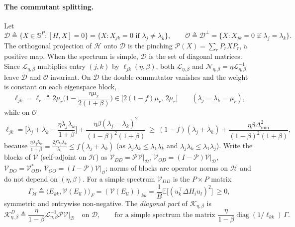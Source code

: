 \documentclass[11pt]{article}
\theoremstyle{remark}
\newcommand{\E}{\mathbb{E}}
\begin{document}
\paragraph{The commutant splitting.} Let
\[
\mathcal D\triangleq\{X\in\mathbb S^P:[H,X]=0\}=\{X:X_{jk}=0\text{ if }\lambda_j\ne\lambda_k\},\qquad\mathcal O\triangleq\mathcal D^{\perp}=\{X:X_{jk}=0\text{ if }\lambda_j=\lambda_k\}.
\]
The orthogonal projection of $\mathcal H$ onto $\mathcal D$ is the pinching $\mathcal P(X)=\sum_rP_rXP_r$, a positive map. When the spectrum is simple, $\mathcal D$ is the set of diagonal matrices. Since $\mathcal L_{\eta,\beta}$ multiplies entry $(j,k)$ by $\ell_{jk}(\eta,\beta)$, both $\mathcal L_{\eta,\beta}$ and $\mathcal N_{\eta,\beta}=\eta\mathcal L_{\eta,\beta}^{-1}$ leave $\mathcal D$ and $\mathcal O$ invariant. On $\mathcal D$ the double commutator vanishes and the weight is constant on each eigenspace block,
\begin{equation}\label{eq:diag-wD}
\ell_{jk}=\ell_r\triangleq2\mu_r\Big(1-\frac{\eta\mu_r}{2(1+\beta)}\Big)\in\big[2(1-f)\mu_r,\,2\mu_r\big]\qquad(\lambda_j=\lambda_k=\mu_r),
\end{equation}
while on $\mathcal O$
\begin{equation}\label{eq:diag-wO}
\ell_{jk}=\Big[\lambda_j+\lambda_k-\frac{\eta\lambda_j\lambda_k}{1+\beta}\Big]+\frac{\eta\beta(\lambda_j-\lambda_k)^2}{(1-\beta)^2(1+\beta)}\ \ge\ (1-f)(\lambda_j+\lambda_k)+\frac{\eta\beta\Delta_{\min}^2}{(1-\beta)^2(1+\beta)},
\end{equation}
because $\frac{\eta\lambda_j\lambda_k}{1+\beta}=\frac{2f\lambda_j\lambda_k}{\lambda_1}\le f(\lambda_j+\lambda_k)$ (as $\lambda_j\lambda_k\le\lambda_1\lambda_k$ and $\lambda_j\lambda_k\le\lambda_1\lambda_j$). Write the blocks of $\mathcal V$ (self-adjoint on $\mathcal H$) as $\mathcal V_{DD}=\mathcal P\mathcal V|_{\mathcal D}$, $\mathcal V_{OD}=(I-\mathcal P)\mathcal V|_{\mathcal D}$, $\mathcal V_{DO}=\mathcal V_{OD}^{*}$, $\mathcal V_{OO}=(I-\mathcal P)\mathcal V|_{\mathcal O}$; norms of blocks are operator norms on $\mathcal H$ and do not depend on $(\eta,\beta)$. For a simple spectrum $\mathcal V_{DD}$ is the $P\times P$ matrix
\begin{equation}\label{eq:diag-Gamma}
\Gamma_{kl}\triangleq\langle E_{kk},\mathcal V(E_{ll})\rangle_F=(\mathcal V(E_{ll}))_{kk}=\frac1B\E\big[(u_k^\top\Delta H_iu_l)^2\big]\ \ge0,
\end{equation}
symmetric and entrywise non-negative. The \emph{diagonal part} of $\mathcal K_{\eta,\beta}$ is
\[
\mathcal K^{D}_{\eta,\beta}\triangleq\frac{\eta}{1-\beta}\mathcal L_{\eta,\beta}^{-1}\mathcal P\mathcal V\Big|_{\mathcal D}\quad\text{on }\mathcal D,\qquad\text{for a simple spectrum the matrix }\frac{\eta}{1-\beta}\operatorname{diag}(1/\ell_{kk})\,\Gamma .
\]
\end{document}
